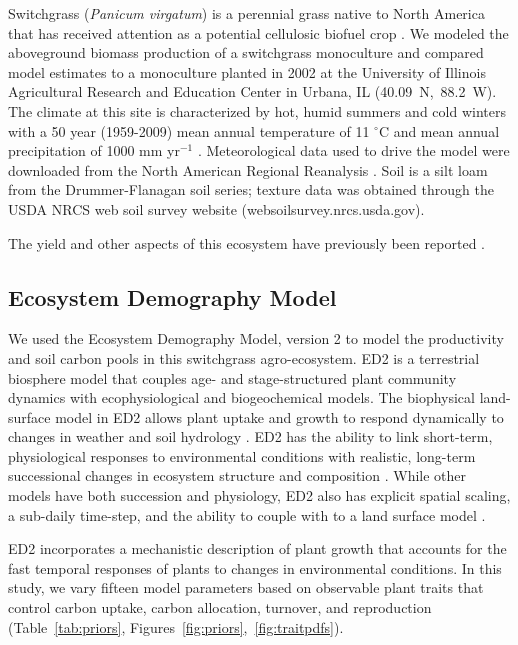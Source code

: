 \documentclass[12pt]{article}
\begin{document}
\begin{flushleft}
\begin{spacing}{1.9}
 Switchgrass (\emph{Panicum virgatum}) is a perennial grass native to North America that has received attention as a potential cellulosic biofuel crop \citep{mclaughlin2005dsp,wang2010qrc}.
 We modeled the aboveground biomass production of a switchgrass monoculture and compared model estimates to a monoculture planted in 2002 at the University of Illinois Agricultural Research and Education Center in Urbana, IL (40.09~N,~88.2~W).
 The climate at this site is characterized by hot, humid summers and cold winters with a 50 year (1959-2009) mean annual temperature of 11 $^\circ$C and mean annual precipitation of 1000  mm yr$^{-1}$ \citep{ISWS2010}.
 Meteorological data used to drive the model were downloaded from the North American Regional Reanalysis \citep{mesinger2006nar}.
 Soil is a silt loam from the Drummer-Flanagan soil series; texture data was obtained through the USDA NRCS web soil survey website (websoilsurvey.nrcs.usda.gov).  

 The yield and other aspects of this ecosystem have previously been reported \citep{heaton2008mub}.

\subsection*{Ecosystem Demography Model}
 We used the Ecosystem Demography Model, version 2 to model the productivity and soil carbon pools in this switchgrass agro-ecosystem.
 ED2 is a terrestrial biosphere model that couples age- and stage-structured plant community dynamics with ecophysiological and biogeochemical models.
 The biophysical land-surface model in ED2 allows plant uptake and growth to respond dynamically to changes in weather and soil hydrology \citep{medvigy2009mse}.
  ED2 has the ability to link short-term, physiological responses to environmental conditions with realistic, long-term successional changes in ecosystem structure and composition \citep{moorcroft2001msv}. 
  While other models have both succession and physiology, ED2 also has explicit spatial scaling, a sub-daily time-step, and the ability to couple with to a land surface model \citep{dietze2011fs}.

 ED2 incorporates a mechanistic description of plant growth that accounts for the fast temporal responses of plants to changes in environmental conditions.
 In this study, we vary fifteen model parameters based on observable plant traits that control carbon uptake, carbon allocation, turnover, and reproduction (Table~\ref{tab:priors}, Figures~\ref{fig:priors},~\ref{fig:traitpdfs}).


\end{spacing}
\end{flushleft}
\end{document}
